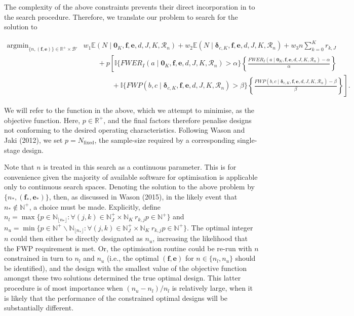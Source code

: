 \documentclass{article}
\numberwithin{equation}{section}
\theoremstyle{plain}
\DeclareMathOperator*{\argmin}{argmin}
\begin{document}
The complexity of the above constraints prevents their direct incorporation in to the search procedure. Therefore, we translate our problem to search for the solution to
\begin{small}
	\begin{align*}
	\argmin_{\{n, (\boldsymbol{f}, \boldsymbol{e})\} \in \mathbb{R}^+\times\mathscr{B}'} & w_1\mathbb{E}(N\mid\boldsymbol{0}_K,\boldsymbol{f},\boldsymbol{e},d,J,K,\mathscr{R}_n) + w_2\mathbb{E}(N\mid\boldsymbol{\delta}_{c,K},\boldsymbol{f},\boldsymbol{e},d,J,K,\mathscr{R}_n) + w_3n\sum_{k=0}^Kr_{k,J}\\
	& \qquad + p\left[\mathbb{I}\{FWER_I(a\mid\boldsymbol{0}_K, \boldsymbol{f},\boldsymbol{e},d,J,K,\mathscr{R}_n)>\alpha\}\left\{\frac{FWER_I(a\mid\boldsymbol{0}_K, \boldsymbol{f},\boldsymbol{e},d,J,K,\mathscr{R}_n)-\alpha}{\alpha}\right\} \right.\\
	& \left. \qquad \qquad + \mathbb{I}\{FWP(b,c\mid \boldsymbol{\delta}_{c,K},\boldsymbol{f},\boldsymbol{e},d,J,K,\mathscr{R}_n)>\beta\}\left\{\frac{FWP(b,c\mid \boldsymbol{\delta}_{c,K},\boldsymbol{f},\boldsymbol{e},d,J,K,\mathscr{R}_n)-\beta}{\beta}\right\}\right].
	\end{align*}
\end{small}
We will refer to the function in the above, which we attempt to minimise, as the objective function. Here, $p\in\mathbb{R}^+$, and the final factors therefore penalise designs not conforming to the desired operating characteristics. Following Wason and Jaki (2012), we set $p=N_{\text{fixed}}$, the sample-size required by a corresponding single-stage design.

Note that $n$ is treated in this search as a continuous parameter. This is for convenience given the majority of available software for optimisation is applicable only to continuous search spaces. Denoting the solution to the above problem by $\{n_*,(\boldsymbol{f}_*,\boldsymbol{e}_*)\}$, then, as discussed in Wason (2015), in the likely event that $n_*\notin\mathbb{N}^+$, a choice must be made. Explicitly, define $n_l = \max\{p\in\mathbb{N}_{\lfloor n_* \rfloor} : \forall(j,k)\in\mathbb{N}_J^+\times\mathbb{N}_K \ r_{k,j}p\in\mathbb{N}^+\}$ and $n_u = \min\{p\in\mathbb{N}^+\backslash\mathbb{N}_{\lfloor n_* \rfloor} : \forall(j,k)\in\mathbb{N}_J^+\times\mathbb{N}_K \ r_{k,j}p\in\mathbb{N}^+\}$. The optimal integer $n$ could then either be directly designated as $n_u$, increasing the likelihood that the FWP requirement is met. Or, the optimisation routine could be re-run with $n$ constrained in turn to $n_l$ and $n_u$ (i.e., the optimal $(\boldsymbol{f},\boldsymbol{e})$ for $n\in\{n_l,n_u\}$ should be identified), and the design with the smallest value of the objective function amongst these two solutions determined the true optimal design. This latter procedure is of most importance when $(n_u-n_l)/n_l$ is relatively large, when it is likely that the performance of the constrained optimal designs will be substantially different.
\end{document}
